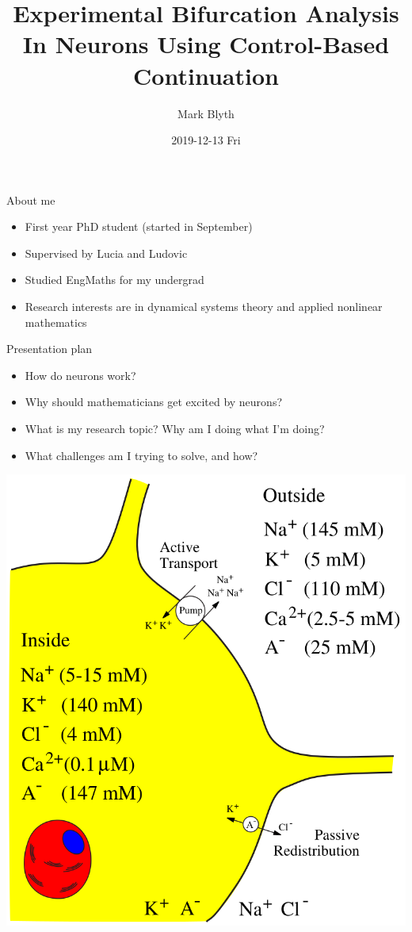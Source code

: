 \documentclass[aspectratio=169]{beamer}
\author{Mark Blyth}
\date{2019-12-13 Fri}
\title{Experimental Bifurcation Analysis In Neurons Using Control-Based Continuation}
\begin{document}
\maketitle

\begin{frame}[label={sec:orgb08c190}]{About me}
\begin{itemize}
\item First year PhD student (started in September)
\item Supervised by Lucia and Ludovic
\item Studied EngMaths for my undergrad
\item Research interests are in dynamical systems theory and applied nonlinear mathematics
\end{itemize}
\end{frame}


\begin{frame}[label={sec:org61c3a39}]{Presentation plan}
\begin{itemize}
    \item \alert{How do neurons work?}
\item Why should mathematicians get excited by neurons?
\item What is my research topic? Why am I doing what I'm doing?
\item What challenges am I trying to solve, and how?
\end{itemize}


\end{frame}
\begin{frame}[plain]
\begin{center}
\includegraphics[height=1.4\textheight]{./neuron_diagram.png}
\end{center}
\end{frame}
\end{document}
